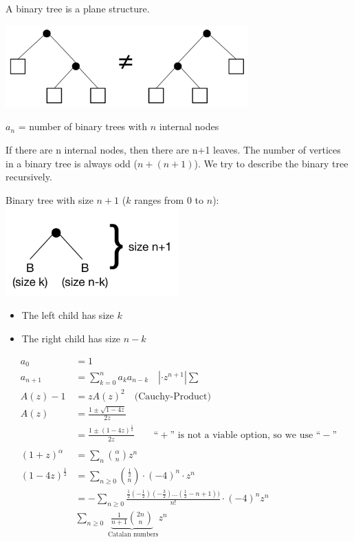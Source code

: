 A binary tree is a plane structure.

\begin{center}
  \includegraphics[width=0.7\textwidth]
    {02_higher_combinatorics/pics/BinaryTreeUnequal}
\end{center}

$a_n$ = number of binary trees with $n$ internal nodes

If there are n internal nodes, then there are n+1 leaves. The number of vertices in a binary tree is always odd ($n + (n+1)$). We try to describe the binary tree recursively.

\begin{center}
  Binary tree with size $n+1$ ($k$ ranges from $0$ to $n$):
  \includegraphics[width=0.5\textwidth]
    {02_higher_combinatorics/pics/BinaryTreeRecursion}
\end{center}
\begin{itemize}
  \item The left child has size $k$
  \item The right child has size $n-k$
\end{itemize}
\begin{align*}
    a_0 &= 1 \\
    a_{n+1} &= \sum_{k=0}^{n} a_k a_{n-k}
        \quad | \cdot z^{n+1} | \sum \\
    A(z) - 1 &= z A(z)^2
        \quad \text{(Cauchy-Product)} \\
    A(z) &= \frac{1 \pm \sqrt{1-4z}}{2z}\\
        &= \frac{1 \pm (1-4z)^\frac1{2}}{2z} \qquad
    \text{“$+$” is not a viable option, so we use “$-$”} \\
     \\
    (1 + z)^\alpha &= \sum_n {\binom{\alpha}{ n}} z^n \\
    (1-4z)^\frac1{2} &= \sum_{n \geq 0} \binom{\frac12}{n} \cdot (-4)^n \cdot z^n\\
	&= - \sum_{n\geq 0} \frac{\frac12 (-\frac12) (-\frac32) \ldots (\frac12 - n+1))}{n!} \cdot (-4)^n z^n \\
    &\sum_{n\geq 0} \underbrace{\frac{1}{n+1} {\binom{2n}{n}}}_{\text{ Catalan numbers}} z^n
\end{align*}

